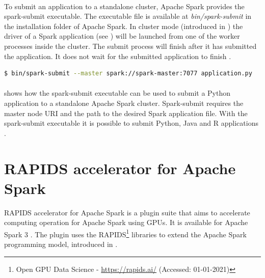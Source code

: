 \paragraph{}To submit an application to a standalone cluster, Apache Spark provides the spark-submit executable. The executable file is available at \textit{bin/spark-submit} in the installation folder of Apache Spark.
In cluster mode (introduced in ) the driver of a Spark application (see ) will be launched from one of the worker processes inside the cluster.
The submit process will finish after it has submitted the application. It does not wait for the submitted application to finish \cite{Apache2020Spark}.


\begin{lstlisting}[label=lst:04_spark_standalone_submit_example, caption=Example usage of the spark-submit executable, language=bash]
$ bin/spark-submit --master spark://spark-master:7077 application.py
\end{lstlisting}


\paragraph{} shows how the spark-submit executable can be used to submit a Python application to a standalone Apache Spark cluster.
Spark-submit requires the master node URI and the path to the desired Spark application file.
With the spark-submit executable it is possible to submit Python, Java and R applications \cite{Apache2020Spark}.


\section{RAPIDS accelerator for Apache Spark}
\label{sec:04_rapids}
RAPIDS accelerator for Apache Spark is a plugin suite that aims to accelerate computing operation for Apache Spark using GPUs. It is available for Apache Spark 3 \cite{SparkRapids2020Docs}.
The plugin uses the RAPIDS\footnote{Open GPU Data Science - \url{https://rapids.ai/} (Accessed: 01-01-2021)} libraries to extend the Apache Spark programming model, introduced in  \cite{SparkRapids2020Docs, Mcdonald2020SparkRapids}.


